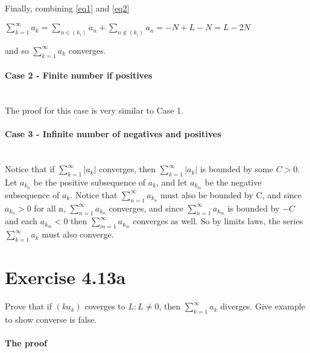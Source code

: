 \documentclass[11pt]{article}
\begin{document}
Finally, combining \eqref{eq1} and \eqref{eq2}

$\sum\limits_{k=1}^{\infty}a_k = \sum\limits_{n \in (k_i)} a_n + \sum\limits_{n \notin (k_i)} a_{n} = -N + L - N = L - 2N$


and so $\sum\limits_{k=1}^{\infty}a_k$ converges.

\paragraph{Case 2 - Finite number if positives} ~\\

The proof for this case is very similar to Case 1.

\paragraph{Case 3 - Infinite number of negatives and positives} ~\\

Notice that if $\sum\limits_{k=1}^{\infty}|a_k|$ converges, then $\sum\limits_{k=1}^{\infty}|a_k|$ is bounded by some $C>0$. Let $a_{k_n}$ be the positive subsequence of $a_k$, and let $a_{k_m}$ be the negative subsequence of $a_k$. Notice that $\sum\limits_{n=1}^{\infty}a_{k_n}$ must also be bounded by C, and since $a_{k_n}>0$ for all n, $\sum\limits_{n=1}^{\infty}a_{k_n}$ converges, and since $\sum\limits_{n=1}^{\infty}a_{k_m}$ is bounded by $-C$ and each $a_{k_m}<0$ then $\sum\limits_{m=1}^{\infty}a_{k_m}$ converges as well. So by limits laws, the series $\sum\limits_{k=1}^{\infty}a_k$ must also converge.


\section*{Exercise 4.13a} 

Prove that if $(ka_k)$ coverges to $L:L\neq0$, then $\sum\limits_{k=1}^{\infty}a_k$ diverges. Give example to show converse is false.

\bigskip

\paragraph{The proof}~\\
\end{document}
